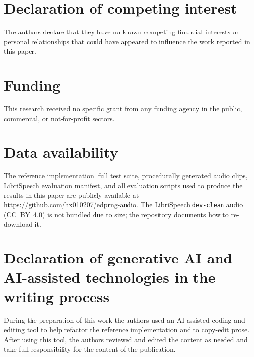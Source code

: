 \documentclass[pdflatex,sn-mathphys-num]{sn-jnl}%
\theoremstyle{thmstyleone}%
\theoremstyle{thmstyletwo}%
\theoremstyle{thmstylethree}%
\begin{document}
\section*{Declaration of competing interest}

The authors declare that they have no known competing financial interests or personal relationships that could have appeared to influence the work reported in this paper.

\section*{Funding}

This research received no specific grant from any funding agency in the public, commercial, or not-for-profit sectors.

\section*{Data availability}

The reference implementation, full test suite, procedurally generated audio clips, LibriSpeech evaluation manifest, and all evaluation scripts used to produce the results in this paper are publicly available at \url{https://github.com/hx010207/edprng-audio}. The LibriSpeech \texttt{dev-clean} audio (CC~BY~4.0) is not bundled due to size; the repository documents how to re-download it.

\section*{Declaration of generative AI and AI-assisted technologies in the writing process}

During the preparation of this work the authors used an AI-assisted coding and editing tool to help refactor the reference implementation and to copy-edit prose. After using this tool, the authors reviewed and edited the content as needed and take full responsibility for the content of the publication.
\end{document}
